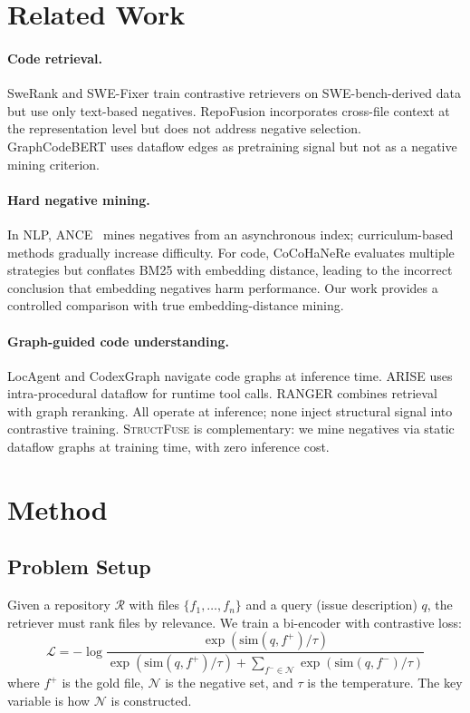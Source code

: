\documentclass[11pt,a4paper]{article}
\newcommand{\ours}{\textsc{StructFuse}}
\begin{document}
\section{Related Work}

\paragraph{Code retrieval.} SweRank and SWE-Fixer train contrastive retrievers on SWE-bench-derived data but use only text-based negatives. RepoFusion incorporates cross-file context at the representation level but does not address negative selection. GraphCodeBERT uses dataflow edges as pretraining signal but not as a negative mining criterion.

\paragraph{Hard negative mining.} In NLP, ANCE~\cite{ance} mines negatives from an asynchronous index; curriculum-based methods gradually increase difficulty. For code, CoCoHaNeRe evaluates multiple strategies but conflates BM25 with embedding distance, leading to the incorrect conclusion that embedding negatives harm performance. Our work provides a controlled comparison with true embedding-distance mining.

\paragraph{Graph-guided code understanding.} LocAgent and CodexGraph navigate code graphs at inference time. ARISE uses intra-procedural dataflow for runtime tool calls. RANGER combines retrieval with graph reranking. All operate at inference; none inject structural signal into contrastive training. \ours{} is complementary: we mine negatives via static dataflow graphs at training time, with zero inference cost.

\section{Method}

\subsection{Problem Setup}

Given a repository $\mathcal{R}$ with files $\{f_1, \ldots, f_n\}$ and a query (issue description) $q$, the retriever must rank files by relevance. We train a bi-encoder with contrastive loss:
\begin{equation}
\mathcal{L} = -\log \frac{\exp(\text{sim}(q, f^+)/\tau)}{\exp(\text{sim}(q, f^+)/\tau) + \sum_{f^- \in \mathcal{N}} \exp(\text{sim}(q, f^-)/\tau)}
\end{equation}
where $f^+$ is the gold file, $\mathcal{N}$ is the negative set, and $\tau$ is the temperature. The key variable is how $\mathcal{N}$ is constructed.
\end{document}
